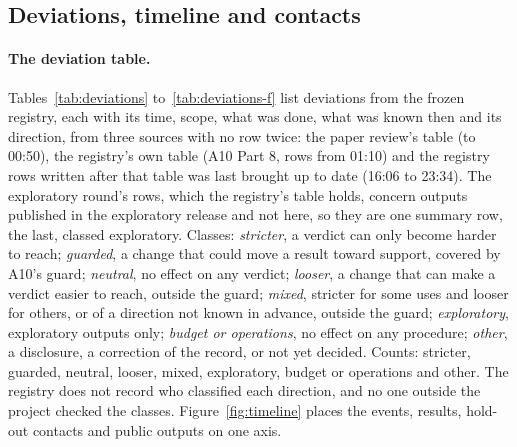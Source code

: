\subsection{Deviations, timeline and contacts}
\label{app:deviations}

\paragraph{The deviation table.} Tables~\ref{tab:deviations} to~\ref{tab:deviations-f} list \NDeviationRows{}
deviations from the frozen registry, each with its time, scope, what was done, what was known then and its direction,
from three sources with no row twice: the paper review's table (to 00:50), the registry's own table (A10 Part 8, rows
from 01:10) and the registry rows written after that table was last brought up to date (16:06 to 23:34). The
exploratory round's \NDevRoundRows{} rows, which the registry's table holds, concern outputs published in the
exploratory release and not here, so they are one summary row, the last, classed exploratory. Classes:
\emph{stricter}, a verdict can only become harder to reach; \emph{guarded}, a change that could move a result toward
support, covered by A10's guard; \emph{neutral}, no effect on any verdict; \emph{looser}, a change that can make a
verdict easier to reach, outside the guard; \emph{mixed}, stricter for some uses and looser for others, or of a
direction not known in advance, outside the guard; \emph{exploratory}, exploratory outputs only; \emph{budget or
operations}, no effect on any procedure; \emph{other}, a disclosure, a correction of the record, or not yet decided.
Counts: \NDevStricter{} stricter, \NDevGuarded{} guarded, \NDevNeutral{} neutral, \NDevLooser{} looser, \NDevMixed{}
mixed, \NDevExploratory{} exploratory, \NDevBudget{} budget or operations and \NDevOther{} other. The registry does not
record who classified each direction, and no one outside the project checked the classes. Figure~\ref{fig:timeline}
places the events, results, hold-out contacts and public outputs on one axis.

